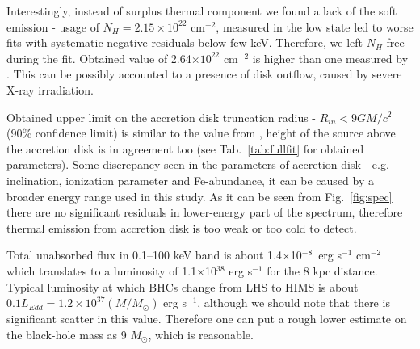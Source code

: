 \documentclass[a4paper,fleqn,usenatbib]{mnras}
\begin{document}
Interestingly, instead of surplus thermal component we found a lack of the soft emission - usage of $N_{H} = 2.15\times10^{22}$ cm$^{-2}$, measured in the low state \citep{fuerst16_gx339} led to worse fits with systematic negative residuals below few keV. 
Therefore, we left $N_{H}$ free during the fit. 
Obtained value of 2.64$\times10^{22}$ cm$^{-2}$ is higher than one measured by \cite{fuerst16_gx339}. 
This can be possibly accounted to a presence of disk outflow, caused by severe X-ray irradiation. 

Obtained upper limit on the accretion disk truncation radius - $R_{in} < 9 GM/c^{2}$ (90\% confidence limit) is similar to the value from \cite{miller15_nust}, height of the source above the accretion disk is in agreement too (see Tab.~\ref{tab:fullfit} for obtained parameters). 
Some discrepancy seen in the parameters of accretion disk - e.g. inclination, ionization parameter and Fe-abundance, it can be caused by a broader energy range used in this study. 
As it can be seen from Fig.~\ref{fig:spec} there are no significant residuals in lower-energy part of the spectrum, therefore thermal emission from accretion disk is too weak or too cold to detect. 

Total unabsorbed flux in 0.1--100 keV band is about 1.4$\times$10$^{-8}$~erg s$^{-1}$ cm$^{-2}$ which translates to a luminosity of 1.1$\times$10$^{38}$ erg s$^{-1}$ for the 8 kpc distance. 
Typical luminosity at which BHCs change from LHS to HIMS is about $0.1 L_{Edd} = 1.2\times10^{37} (M/M_{\odot})$ erg s$^{-1}$, although we should note that there is significant scatter in this value. 
Therefore one can put a rough lower estimate on the black-hole mass as 9 $M_{\odot}$, which is reasonable.
\end{document}
